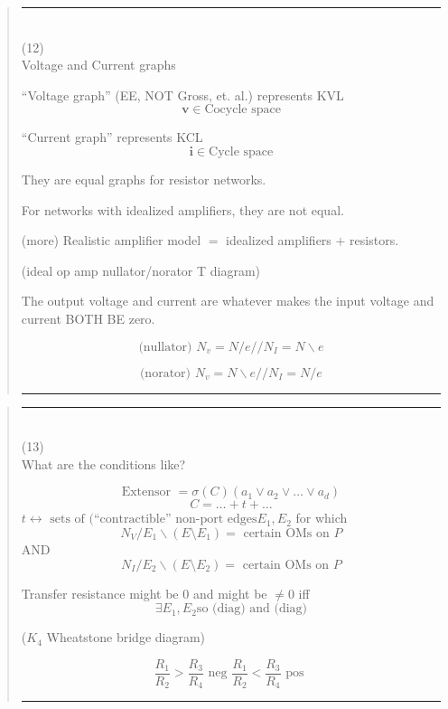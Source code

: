 \documentclass{article}
\begin{document}
\pagebreak[3] \begin{quote}\rule{\textwidth}{3pt}\\
(12)\\
Voltage and Current graphs



\begin{minipage}{0.4\textwidth}
``Voltage graph'' (EE, NOT Gross, et. al.) represents KVL
\[\mathbf{v}\in \text{Cocycle space}\]
\end{minipage}
\begin{minipage}{0.4\textwidth}
``Current graph'' represents KCL
\[\mathbf{i}\in \text{Cycle space}\]
\end{minipage}
They are equal graphs for resistor networks.

For networks with idealized amplifiers, they are not 
equal.  

(more) Realistic amplifier model $=$ idealized amplifiers $+$ 
resistors.

(ideal op amp nullator/norator T diagram)

The output voltage and current are whatever makes the input
voltage and current BOTH BE zero.

\begin{minipage}{0.4\textwidth}
\[
\text{(nullator)\ }N_v = N/e// 
N_I = N\backslash e
\]
\end{minipage}
\begin{minipage}{0.4\textwidth}
\[
\text{(norator)\ }N_v = N\backslash e// 
N_I = N/e
\]
\end{minipage}



\rule{\textwidth}{3pt}
\end{quote}

\pagebreak[3] \begin{quote}\rule{\textwidth}{3pt}\\
(13)\\
What are the conditions like?

\[
\text{Extensor\ }= \sigma(C)(a_1\vee a_2\vee \ldots \vee a_d)
\]
\[
C = \ldots + t + \ldots
\]
$t \leftrightarrow \text{\ sets of (``contractible'' non-port edges} 
E_1, E_2$ for which
\[
N_V/E_1\backslash(E\setminus E_1) = \text{\ certain OMs on\ } P
\]
AND
\[
N_I/E_2\backslash(E\setminus E_2) = \text{\ certain OMs on\ } P
\]

Transfer resistance might be 0 and might be $\neq 0$ iff
\[
\exists E_1, E_2 \text{so (diag) and (diag)}
\]

($K_4$ Wheatstone bridge diagram)

\[
\frac{R_1}{R_2} > \frac{R_3}{R_4} 
\text{\ neg\ }
\frac{R_1}{R_2} < \frac{R_3}{R_4} 
\text{\ pos\ }
\]

\rule{\textwidth}{3pt}
\end{quote}
\end{document}
